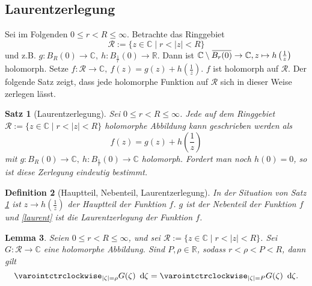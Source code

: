 \documentclass[a4paper,12pt]{article}
\theoremstyle{newthm}
\newtheorem{thm}{Satz}[subsection]
\newtheorem{lem}[thm]{Lemma}
\theoremstyle{newdef}
\newtheorem{defn}[thm]{Definition}
\theoremstyle{newrem}
\newcommand{\R}{\mathbb{R}}
\newcommand{\C}{\mathbb{C}}
\renewcommand{\d}{\ \operatorname{d}\hspace{-2px}}
\newcommand{\overbar}[1]{\mkern 1.5mu\overline{\mkern-1.5mu#1\mkern-1.5mu}\mkern 1.5mu}
\begin{document}
	
	\subsection{Laurentzerlegung}
		
		Sei im Folgenden $ 0 \leq r < R \leq \infty $. Betrachte das Ringgebiet $$ \mathcal{R} := \{z \in \C \mid r < |z| < R\} $$
		und z.B. $ g: B_R(0) \to \C,\ h: B_{\frac{1}{r}}(0) \to \R. $ Dann ist $ \C \setminus \overbar{B_r(0)} \to \C, z \mapsto h\left(\frac{1}{z}\right) $ holomorph. Setze $ f: \mathcal{R} \to \C,\ f(z) = g(z) + h\left(\frac{1}{z}\right). $ $f$ ist holomorph auf $\mathcal{R}$. Der folgende Satz zeigt, dass jede holomorphe Funktion auf $ \mathcal{R} $ sich in dieser Weise zerlegen lässt.
		
		\begin{thm}[Laurentzerlegung]\label{3.3.1}
			Sei $ 0 \leq r < R \leq \infty $. Jede auf dem Ringgebiet $ \mathcal{R} := \{z \in \C \mid r < |z| < R\} $ holomorphe Abbildung kann geschrieben werden als
			\begin{equation}\label{laurent}
			f(z) = g(z) + h\left(\frac{1}{z}\right)
			\end{equation}
			mit $ g: B_R(0) \to \C,\ h: B_{\frac{1}{r}}(0) \to \C $ holomorph. Fordert man noch $h(0) = 0$, so ist diese Zerlegung eindeutig bestimmt.
		\end{thm}
		
		\begin{defn}[Hauptteil, Nebenteil, Laurentzerlegung]
			In der Situation von Satz \ref{3.3.1} ist $ z \to h\left(\frac{1}{z}\right) $ der \emph{Hauptteil} der Funktion $f$. $g$ ist der \emph{Nebenteil} der Funktion $f$ und \ref{laurent} ist die \emph{Laurentzerlegung} der Funktion $f$.
		\end{defn}
		
		\begin{lem}
			Seien $ 0 \leq r < R \leq \infty $, und sei $ \mathcal{R} := \{z \in \C \mid r < |z| < R\} $. Sei $ G: \mathcal{R} \to \C $ eine holomorphe Abbildung. Sind $ P, \rho \in \R $, sodass $ r < \rho < P < R $, dann gilt 
			\[ \varointctrclockwise_{|\zeta| = \rho} G(\zeta) \d\zeta = \varointctrclockwise_{|\zeta| = P} G(\zeta)\d\zeta. \]
		\end{lem}
		
\end{document}
